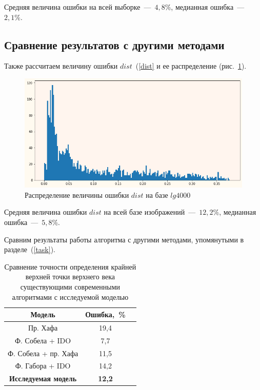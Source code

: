 \documentclass[12pt,a4paper]{article} %
\begin{document}
Средняя величина ошибки на всей выборке~---~$4,8\%$, медианная ошибка~---~$2,1\%$.


\subsection{Сравнение результатов с другими методами}
Также рассчитаем величину ошибки $dist$~(\ref{dist} и ее распределение (рис.~\ref{fig:gist2}).

\begin{figure}[h]
	\centering
	
	\includegraphics[width=0.67\linewidth]{gist2.jpg}
	\caption{Распределение величины ошибки $dist$ на базе $lg4000$}
	
	\label{fig:gist2}
\end{figure}

Средняя величина ошибки $dist$ на всей базе изображений~---~$12,2\%$, медианная ошибка~---~$5,8\%$.

Сравним результаты работы алгоритма с другими методами, упомянутыми в разделе~(\ref{task}).

\begin{table}[h]
	\centering
	\begin{tabular}{ccc}
		\hline Модель & Ошибка,~\%  &   \\
		\hline Пр. Хафа \cite{Wildes} & 19,4 &  \\
		Ф. Собела + IDO \cite{KP} & 7,7 &   \\
		Ф. Собела + пр. Хафа \cite{Adam_1} & 11,5 &  \\
		Ф. Габора + IDO \cite{KKX} & 14,2 &   \\
		\hline
		\textbf{Исследуемая модель}&   \textbf{12,2}&     \\
		\hline 
	\end{tabular}

	\caption{Сравнение точности определения крайней верхней точки верхнего века существующими современными алгоритмами с исследуемой моделью}
	\label{Tab:1}
\end{table}
\end{document}
